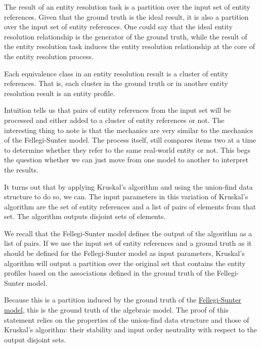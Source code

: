 \documentclass[lettersize,journal]{IEEEtran}
\begin{document}
    The result of an entity resolution task is a partition over the input set of
    entity references.
    Given that the ground truth is the ideal result, it is also a partition over
    the input set of entity references.
    One could say that the ideal entity resolution relationship is the generator
    of the ground truth, while the result of the entity resolution task induces
    the entity resolution relationship at the core of the entity resolution
    process.
    
    Each equivalence class in an entity resolution result is a cluster of entity
    references.
    That is, each cluster in the ground truth or in another entity resolution
    result is an entity profile.

    Intuition tells us that pairs of entity references from the input set will
    be processed and either added to a cluster of entity references or not.
    The interesting thing to note is that the mechanics are very similar to
    the mechanics of the Fellegi-Sunter model.
    The process itself, still compares items two at a time to determine whether
    they refer to the same real-world entity or not.
    This begs the question whether we can just move from one model to another
    to interpret the results.

    It turns out that by applying Kruskal's algorithm and using the union-find
    data structure to do so, we can.
    The input parameters in this variation of Kruskal's algorithm are the set
    of entity references and a list of pairs of elements from that set.
    The algorithm outputs disjoint sets of elements.

    We recall that the Fellegi-Sunter model defines the output of the algorithm
    as a list of pairs.
    If we use the input set of entity references and a ground truth as it should
    be defined for the Fellegi-Sunter model as input parameters, Kruskal's
    algorithm will output a partition over the original set that contains the
    entity profiles based on the associations defined in the ground truth of the
    Fellegi-Sunter model.

    Because this is a partition induced by the ground truth of the
    \hyperref[subsec:fsm]{Fellegi-Sunter model}, this is the ground truth of the
    algebraic model.
    The proof of this statement relies on the properties of the union-find data
    structure and those of Kruskal's algorithm: their stability and input order
    neutrality with respect to the output disjoint sets.
\end{document}
